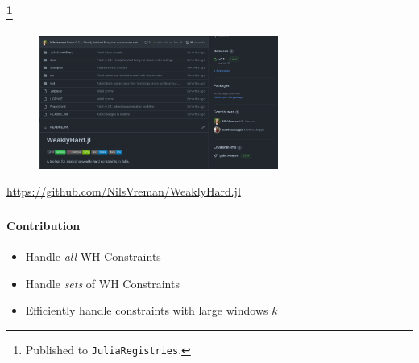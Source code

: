 \begin{frame}
    \frametitle{\tool{}\footnote{Published to \texttt{JuliaRegistries}.}}
    \begin{figure}[h]
        \centering
        \includegraphics[width=0.7\textwidth]{figs/rtas22b/git.png}
    \end{figure}

    \begin{center}
        \Large
        \textcolor{hicolour}{\url{https://github.com/NilsVreman/WeaklyHard.jl}}
    \end{center}
\end{frame}

\begin{frame}
    \frametitle{\tool{}}
    \framesubtitle{Contribution}

    \begin{itemize}\setlength\itemsep{1em}
        \item Handle \emph{all} WH Constraints
        \item Handle \emph{sets} of WH Constraints
        \item Efficiently handle constraints with large windows $k$
    \end{itemize}
\end{frame}
